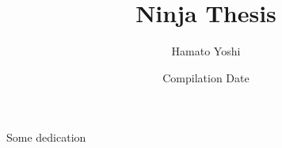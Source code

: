 \usepackage[style=alphabetic,natbib=true]{biblatex}
\usepackage{lipsum}



\title{Ninja Thesis}
\author{Hamato Yoshi}

\date{Compilation Date}

\address{%
First Line\\
Second Line\\
Third Line\\
\url{http://www.somewhere.com}
}






\maketitle
\frontmatter
\thispagestyle{empty}
\begin{abstract}

\end{abstract}
\cleardoublepage




\begin{dedication}
Some dedication
\end{dedication}

